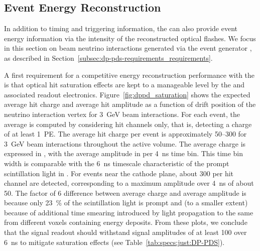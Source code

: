 
\subsection{Event Energy Reconstruction}
\label{subsec:dp-pds-performance_calorimetry}

In addition to timing and triggering information, the  can also provide event energy information via the intensity of the reconstructed optical flashes. We focus in this section on beam neutrino interactions generated via the  event generator \cite{Andreopoulos:2009rq}, as described in Section~\ref{subsec:dp-pds-requirements_requirements}.

A first requirement for a competitive energy reconstruction performance with the  is that optical hit saturation effects are kept to a manageable level by the  and associated readout electronics. Figure~\ref{fig:dppd_saturation} shows the expected average hit charge and average hit amplitude as a function of drift position of the neutrino interaction vertex for \SI{3}{\GeV} beam \nue {} interactions. For each event, the average is computed by considering hit  channels only, that is,  detecting a charge of at least \SI{1}{PE}. The average hit charge per event is approximately \SIrange{50}{300}{} for \SI{3}{\GeV} beam \nue {} interactions throughout the  active volume. The average charge is expressed in , with the average amplitude in  per \SI{4}{\nano\s} time bin. This time bin width is comparable with the \SI{6}{\nano\s} timescale characteristic of the prompt scintillation light in . For events near the cathode plane, about \SI{300}{} per hit channel are detected, corresponding to a maximum amplitude over \SI{4}{\nano\s} of about \SI{50}{}. The factor of 6 difference between average charge and average amplitude is because only \SI{23}{\%} of the scintillation light is prompt and (to a smaller extent) because of additional time smearing introduced by light propagation to the same  from different  voxels containing energy deposits. From these plots, we conclude that the  signal readout should withstand signal amplitudes of at least \SI{100}{} over \SI{6}{\nano\s} to mitigate saturation effects (see Table~\ref{tab:specs:just:DP-PDS}).

